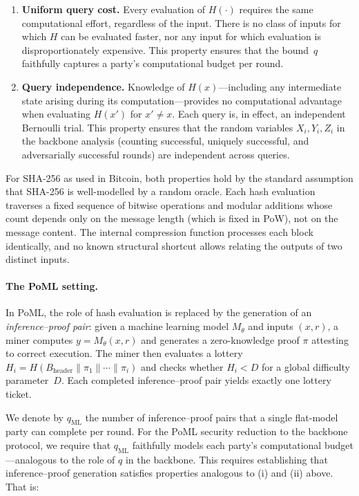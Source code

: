 \documentclass[11pt]{article}
\begin{document}
\begin{enumerate}[label=(\roman*)]
    \item \textbf{Uniform query cost.} Every evaluation of $H(\cdot)$ requires the same computational effort, regardless of the input. There is no class of inputs for which $H$ can be evaluated faster, nor any input for which evaluation is disproportionately expensive. This property ensures that the bound~$q$ faithfully captures a party's computational budget per round.

    \item \textbf{Query independence.} Knowledge of $H(x)$---including any intermediate state arising during its computation---provides no computational advantage when evaluating $H(x')$ for $x' \neq x$. Each query is, in effect, an independent Bernoulli trial. This property ensures that the random variables $X_i, Y_i, Z_i$ in the backbone analysis (counting successful, uniquely successful, and adversarially successful rounds) are independent across queries.
\end{enumerate}

For SHA-256 as used in Bitcoin, both properties hold by the standard assumption that SHA-256 is well-modelled by a random oracle. Each hash evaluation traverses a fixed sequence of bitwise operations and modular additions whose count depends only on the message length (which is fixed in PoW), not on the message content. The internal compression function processes each block identically, and no known structural shortcut allows relating the outputs of two distinct inputs.

\paragraph{The PoML setting.}
In PoML, the role of hash evaluation is replaced by the generation of an \emph{inference--proof pair}: given a machine learning model $M_\theta$ and inputs $(x, r)$, a miner computes $y = M_\theta(x, r)$ and generates a zero-knowledge proof $\pi$ attesting to correct execution. The miner then evaluates a lottery $H_i = H(B_{\mathrm{header}} \| \pi_1 \| \cdots \| \pi_i)$ and checks whether $H_i < D$ for a global difficulty parameter~$D$. Each completed inference--proof pair yields exactly one lottery ticket.

We denote by $q_{\mathrm{ML}}$ the number of inference--proof pairs that a single flat-model party can complete per round. For the PoML security reduction to the backbone protocol, we require that $q_{\mathrm{ML}}$ faithfully models each party's computational budget---analogous to the role of $q$ in the backbone. This requires establishing that inference--proof generation satisfies properties analogous to (i) and (ii) above. That is:
\end{document}
